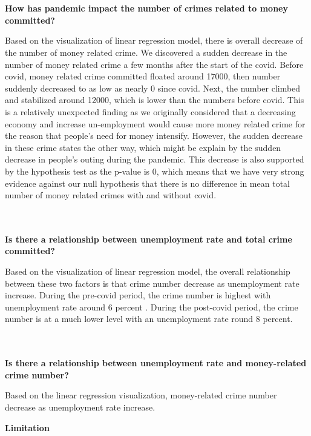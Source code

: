 \documentclass[fontsize=11pt]{article}
\begin{document}
\\ \hspace*{\fill} \\
\textbf{How has pandemic impact the number of crimes related to money committed?}

Based on the visualization of linear regression model, there is overall decrease of the number of money related crime. We discovered a sudden decrease in the number of money related crime a few months after the start of the covid. Before covid, money related crime committed floated around 17000, then number suddenly decreased to as low as nearly 0 since covid. Next, the number climbed and stabilized around 12000, which is lower than the numbers before covid. This is a relatively unexpected finding as we originally considered that a decreasing economy and increase un-employment would cause more money related crime for the reason that people’s need for money intensify. However, the sudden decrease in these crime states the other way, which might be explain by the sudden decrease in people’s outing during the pandemic. This decrease is also supported by the hypothesis test as the p-value is 0, which means that we have very strong evidence against our null hypothesis that there is no difference in mean total number of money related crimes with and without covid. 

\\ \hspace*{\fill} \\
\textbf{Is there a relationship between unemployment rate and total crime committed?}

Based on the visualization of linear regression model, the overall relationship between these two factors is that crime number decrease as unemployment rate increase. During the pre-covid period, the crime number is highest with unemployment rate around 6 percent . During the post-covid period, the crime number is at a much lower level with an unemployment rate round 8 percent.

\\ \hspace*{\fill} \\
\textbf{Is there a relationship between unemployment rate and money-related crime number?}

Based on the linear regression visualization, money-related crime number decrease as unemployment rate increase.

\hspace*{\fill}
\textbf{Limitation}
\end{document}
